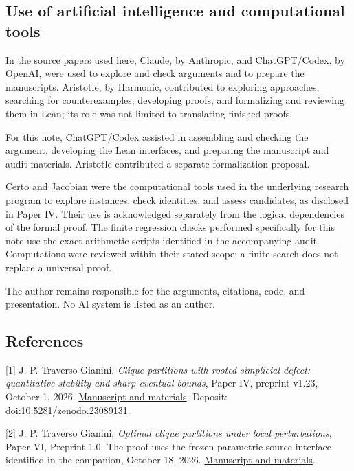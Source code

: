 \documentclass[english,11pt,a4paper]{article}
\begin{document}
\subsection{Use of artificial intelligence and computational
tools}\label{use-of-artificial-intelligence-and-computational-tools}

In the source papers used here, Claude, by Anthropic, and ChatGPT/Codex,
by OpenAI, were used to explore and check arguments and to prepare the
manuscripts. Aristotle, by Harmonic, contributed to exploring
approaches, searching for counterexamples, developing proofs, and
formalizing and reviewing them in Lean; its role was not limited to
translating finished proofs.

For this note, ChatGPT/Codex assisted in assembling and checking the
argument, developing the Lean interfaces, and preparing the manuscript
and audit materials. Aristotle contributed a separate formalization
proposal.

Certo and Jacobian were the computational tools used in the underlying
research program to explore instances, check identities, and assess
candidates, as disclosed in Paper IV. Their use is acknowledged
separately from the logical dependencies of the formal proof. The finite
regression checks performed specifically for this note use the
exact-arithmetic scripts identified in the accompanying audit.
Computations were reviewed within their stated scope; a finite search
does not replace a universal proof.

The author remains responsible for the arguments, citations, code, and
presentation. No AI system is listed as an author.

\subsection{References}\small\label{references}

{[}1{]} J. P. Traverso Gianini, \emph{Clique partitions with rooted
simplicial defect: quantitative stability and sharp eventual bounds},
Paper IV, preprint v1.23, October 1, 2026.
\href{https://github.com/jtraverso/erdos-81-chordal-clique-partitions/blob/054593443bdece587dda9686a411bb18b0ca34c5/preprints/PAPER_IV/01_manuscript/PAPER_IV_preprint_v1.23_en.md}{Manuscript
and materials}. Deposit:
\href{https://doi.org/10.5281/zenodo.23089131}{doi:10.5281/zenodo.23089131}.

{[}2{]} J. P. Traverso Gianini, \emph{Optimal clique partitions under
local perturbations}, Paper VI, Preprint 1.0. The proof uses the frozen
parametric source interface identified in the companion, October 18,
2026.
\href{https://github.com/jtraverso/erdos-81-chordal-clique-partitions/tree/main/preprints/PAPER_VI}{Manuscript
and materials}.
\end{document}
